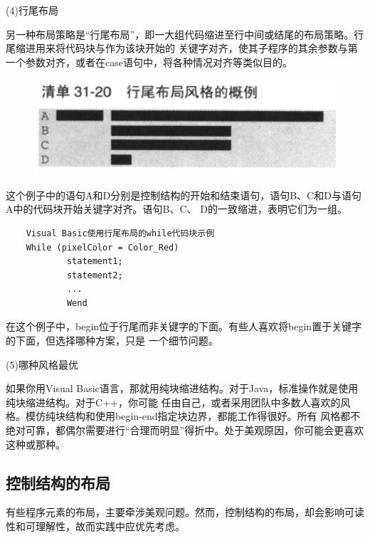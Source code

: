\documentclass{article}
\begin{document}
\par
(4)行尾布局
\par
另一种布局策略是“行尾布局”，即一大组代码缩进至行中间或结尾的布局策略。行尾缩进用来将代码块与作为该块开始的
关键字对齐，使其子程序的其余参数与第一个参数对齐，或者在case语句中，将各种情况对齐等类似目的。
\begin{figure}[htb]
    \centering
    \includegraphics[width=15cm]{figure35.png}
\end{figure}
这个例子中的语句A和D分别是控制结构的开始和结束语句，语句B、C和D与语句A中的代码块开始关键字对齐。语句B、C、
D的一致缩进，表明它们为一组。
\begin{lstlisting}
    Visual Basic使用行尾布局的while代码块示例
    While (pixelColor = Color_Red)
            statement1;
            statement2;
            ...
            Wend
\end{lstlisting}
在这个例子中，begin位于行尾而非关键字的下面。有些人喜欢将begin置于关键字的下面，但选择哪种方案，只是
一个细节问题。

\par
(5)哪种风格最优
\par
如果你用Visual Basic语言，那就用纯块缩进结构。对于Java，标准操作就是使用纯块缩进结构。对于C++，你可能
任由自己，或者采用团队中多数人喜欢的风格。模仿纯块结构和使用begin-end指定块边界，都能工作得很好。所有
风格都不绝对可靠，都偶尔需要进行“合理而明显”得折中。处于美观原因，你可能会更喜欢这种或那种。

\subsection{控制结构的布局}
有些程序元素的布局，主要牵涉美观问题。然而，控制结构的布局，却会影响可读性和可理解性，故而实践中应优先考虑。
\end{document}
